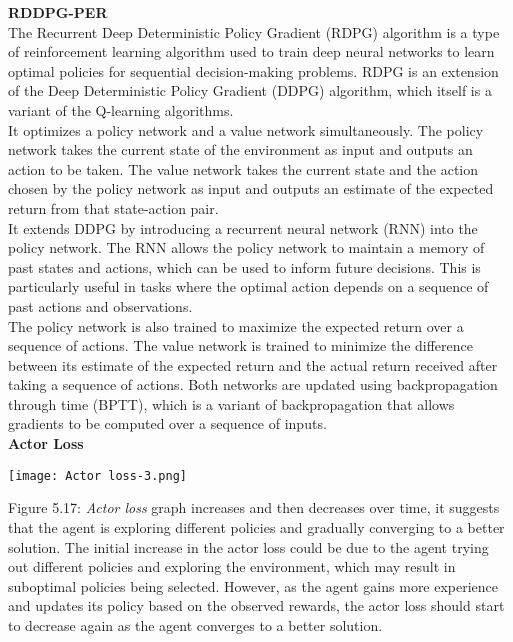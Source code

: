\documentclass[conference]{IEEEtran}
\begin{document}
\textbf{RDDPG-PER}\\

The Recurrent Deep Deterministic Policy Gradient (RDPG) algorithm is a type of reinforcement learning algorithm used to train deep neural networks to learn optimal policies for sequential decision-making problems. RDPG is an extension of the Deep Deterministic Policy Gradient (DDPG) algorithm, which itself is a variant of the Q-learning algorithms.\\
It optimizes a policy network and a value network simultaneously. The policy network takes the current state of the environment as input and outputs an action to be taken. The value network takes the current state and the action chosen by the policy network as input and outputs an estimate of the expected return from that state-action pair.\\
It extends DDPG by introducing a recurrent neural network (RNN) into the policy network. The RNN allows the policy network to maintain a memory of past states and actions, which can be used to inform future decisions. This is particularly useful in tasks where the optimal action depends on a sequence of past actions and observations.\\
The policy network is also trained to maximize the expected return over a sequence of actions. The value network is trained to minimize the difference between its estimate of the expected return and the actual return received after taking a sequence of actions. Both networks are updated using backpropagation through time (BPTT), which is a variant of backpropagation that allows gradients to be computed over a sequence of inputs.\\

\textbf{Actor Loss}\\

\graphicspath{ {./images/} }
\texttt{[image: Actor loss-3.png]}
\caption{Figure 5.17: \textit{Actor loss} graph increases and then decreases over time, it suggests that the agent is exploring different policies and gradually converging to a better solution. The initial increase in the actor loss could be due to the agent trying out different policies and exploring the environment, which may result in suboptimal policies being selected. However, as the agent gains more experience and updates its policy based on the observed rewards, the actor loss should start to decrease again as the agent converges to a better solution.
}\\
\end{document}
